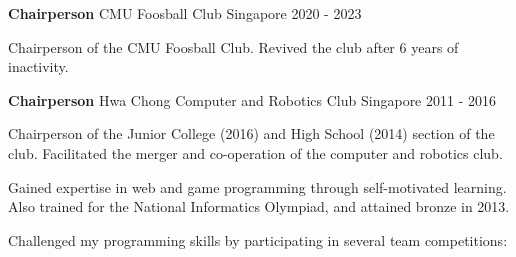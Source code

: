 \begin{cventries}
	
	
	\cventry
	{\textbf{Chairperson}} %
	{CMU Foosball Club} %
	{Singapore} %
	{2020 - 2023} %
	{ %
		\begin{cvitems}
			\item {Chairperson of the CMU Foosball Club. Revived the club after 6 years of inactivity.}
		\end{cvitems}
	}
\end{cventries}

\begin{cventries}


\cventry
{\textbf{Chairperson}} %
{Hwa Chong Computer and Robotics Club} %
{Singapore} %
{2011 - 2016} %
{ %
\begin{cvitems}
	\item {Chairperson of the Junior College (2016) and High School (2014) section of the club. \newline
		Facilitated the merger and co-operation of the computer and robotics club.}
	\item {Gained expertise in web and game programming through self-motivated learning. \newline
		Also trained for the National Informatics Olympiad, and attained bronze in 2013.}
	\item {Challenged my programming skills by participating in several team competitions:}
\end{cvitems}
}
\end{cventries}

